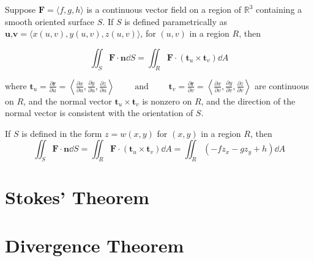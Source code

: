 \documentclass[../calc3.tex]{subfiles}
\begin{document}
\begin{definition}
    Suppose $\textbf{F} = \langle f,g,h\rangle$ is a continuous vector field on a region of $\mathbb{R}^3$ containing a smooth 
    oriented surface $S$. If $S$ is defined parametrically as $\textbf{u,v}=\langle x(u,v), y(u,v), z(u,v)\rangle$, for $(u,v)$ in a region $R$, then 
    
    \[\iint_S \textbf{F}\cdot\textbf{n}\dd S = \iint_R \textbf{F}\cdot(\textbf{t}_u\times\textbf{t}_v)\dd A\]

    where $\textbf{t}_u = \frac{\partial \textbf{r}}{\partial u} = \left\langle \frac{\partial x}{\partial u}, \frac{\partial y}{\partial u}, \frac{\partial z}{\partial u}\right\rangle \qquad \text{ and } \qquad \textbf{t}_v = \frac{\partial\textbf{r}}{\partial v}=\left\langle\frac{\partial x}{\partial v},\frac{\partial y}{\partial v},\frac{\partial z}{\partial v} \right\rangle$
    are continuous on $R$, and the normal vector $\textbf{t}_u\times\textbf{t}_v$ is nonzero on $R$, and the direction of the normal vector is consistent with the orientation of $S$.
\end{definition}

\begin{definition}
    If $S$ is defined in the form $z=w(x,y)$ for $(x,y)$ in a region $R$, then 
    \[\iint_S \textbf{F}\cdot \textbf{n}\dd S = \iint_R \textbf{F}\cdot(\textbf{t}_u\times \textbf{t}_v)\dd A = \iint_R (-fz_x-gz_y+h)\dd A\]

\end{definition}
\section{Stokes' Theorem}
\section{Divergence Theorem}
\end{document}
